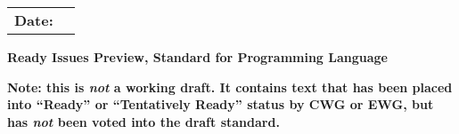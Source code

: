 

\thispagestyle{empty}
\begingroup
\def\hd{\begin{tabular}{ll}
          \textbf{Date:}            & \reldate                    \\
          \end{tabular}
}
\newlength{\hdwidth}
\settowidth{\hdwidth}{\hd}
\hfill\begin{minipage}{\hdwidth}\hd\end{minipage}
\endgroup

\vspace{2.5cm}
\begin{center}
\textbf{\Huge
Ready Issues Preview, Standard for Programming Language \Cpp}
\end{center}
\vspace{2.5cm}
\large{\textbf{
  Note: this is \emph{not} a working draft. It contains text
  that has been placed into ``Ready'' or ``Tentatively Ready''
  status by CWG or EWG, but has \emph{not} been voted into the
  draft \Cpp standard.}}
\newpage
